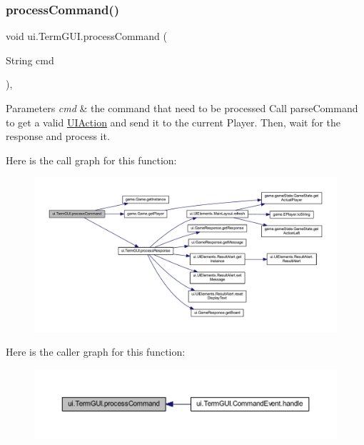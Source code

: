 \subsubsection{\texorpdfstring{process\+Command()}{processCommand()}}
{\footnotesize\ttfamily void ui.\+Term\+G\+U\+I.\+process\+Command (\begin{DoxyParamCaption}\item[{String}]{cmd }\end{DoxyParamCaption})\hspace{0.3cm}{\ttfamily [inline]}, {\ttfamily [private]}}


\begin{DoxyParams}{Parameters}
{\em cmd} & the command that need to be processed Call parse\+Command to get a valid \mbox{\hyperlink{classui_1_1_u_i_action}{U\+I\+Action}} and send it to the current Player. Then, wait for the response and process it. \\
\hline
\end{DoxyParams}
Here is the call graph for this function\+:
\nopagebreak
\begin{figure}[H]
\begin{center}
\leavevmode
\includegraphics[width=350pt]{classui_1_1_term_g_u_i_a8ef774ab2fe02b2469e7b675ba9c5a4d_cgraph}
\end{center}
\end{figure}
Here is the caller graph for this function\+:
\nopagebreak
\begin{figure}[H]
\begin{center}
\leavevmode
\includegraphics[width=350pt]{classui_1_1_term_g_u_i_a8ef774ab2fe02b2469e7b675ba9c5a4d_icgraph}
\end{center}
\end{figure}
\mbox{\label{classui_1_1_term_g_u_i_aa1c37916b26b5ecb5e98a88621cb03c1}} 
